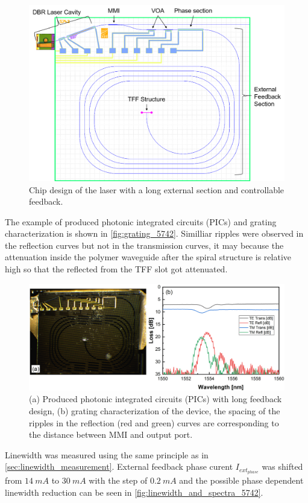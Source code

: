 \begin{figure}[H]
    \centering
    \includegraphics[width=0.8\linewidth]{figures/5742_spiral_comment.png}
    \caption{Chip design of the laser with a long external section and controllable feedback.}
    \label{fig:grating_5742_design}
\end{figure}

The example of produced photonic integrated circuits (PICs) and grating characterization is shown in \autoref{fig:grating_5742}. Similliar ripples were observed in the reflection curves but not in the transmission curves, it may because the attenuation inside the polymer waveguide after the spiral structure is relative high so that the reflected from the TFF slot got attenuated.

\begin{figure}[ht]
    \centering
    \includegraphics[width=\linewidth]{figures/grating_5742.png}
    \caption{(a) Produced photonic integrated circuits (PICs) with long feedback design, (b) grating characterization of the device, the spacing of the ripples in the reflection (red and green) curves are corresponding to the distance between MMI and output port.}
    \label{fig:grating_5742}
\end{figure}

Linewidth was measured using the same principle as in \autoref{sec:linewidth_measurement}. External feedback phase curent $I_{ext_{phase}}$ was shifted from $14 \ mA$ to $30 \ mA$ with the step of $0.2 \ mA$ and the possible phase dependent linewidth reduction can be seen in \autoref{fig:linewidth_and_spectra_5742}. 

